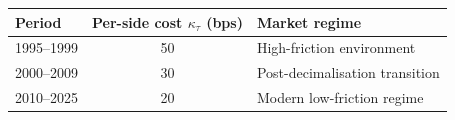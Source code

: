 \begin{tabular}{lcl}
\toprule
Period & Per-side cost \(\kappa_\tau\) (bps) & Market regime \\
\midrule
1995--1999 & 50 & High-friction environment \\
2000--2009 & 30 & Post-decimalisation transition \\
2010--2025 & 20 & Modern low-friction regime \\
\bottomrule
\end{tabular}